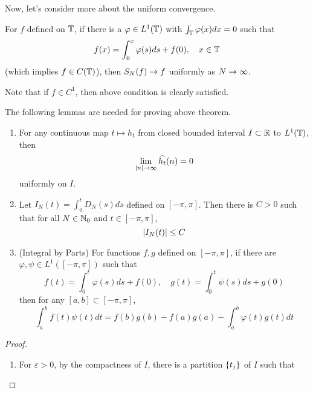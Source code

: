 \begin{enumerate}[label=\arabic*.]
	\noindent Now, let's consider more about the uniform convergence.
	\begin{thm}\label{thm:c1four}
		For $f$ defined on $\mathbb{T}$, if there is a $\varphi \in L^1(\mathbb{T})$ with $\int_{\mathbb{T}} \varphi(x)dx = 0$ such that
		\begin{equation*}
			f(x) = \int_0^x \varphi(s)ds + f(0),\quad x \in \mathbb{T}
		\end{equation*}
		(which implies $f \in C(\mathbb{T})$), then $S_N(f) \rightarrow f$ uniformly as $N \rightarrow \infty$.
	\end{thm}
	\begin{rmk}
		Note that if $f \in C^1$, then above condition is clearly satisfied.
	\end{rmk}
	\begin{lem}
		The following lemmas are needed for proving above theorem.
		\begin{enumerate}[label=\Roman{*}.]
			\item For any continuous map $t \mapsto h_t$ from closed bounded interval $I \subset \mathbb{R}$ to $L^1(\mathbb{T})$, then
			\begin{equation*}
				\lim_{\left\lvert n\right\lvert \rightarrow \infty}\widehat{h_t}(n) = 0
			\end{equation*}
			uniformly on $I$.
			\item Let $I_N(t) = \int_0^t D_N(s)ds$ defined on $[-\pi,\pi]$. Then there is $C > 0$ such that for all $N \in \mathbb{N}_0$ and $t \in [-\pi, \pi]$,
			\begin{equation*}
				\left\lvert I_N(t)\right\lvert \leq C
			\end{equation*}
			\item (Integral by Parts) For functions $f,g$ defined on $[-\pi,\pi]$, if there are $\varphi,\psi \in L^1([-\pi,\pi])$ such that
			\begin{equation*}
				f(t)=\int_0^t \varphi(s) d s+f(0), \quad g(t)=\int_0^t \psi(s) d s+g(0)
			\end{equation*}
			then for any $[a, b] \subset[-\pi, \pi]$,
			\begin{equation*}
				\int_a^b f(t) \psi(t) d t=f(b) g(b)-f(a) g(a)-\int_a^b \varphi(t) g(t) d t
			\end{equation*}
		\end{enumerate}
	\end{lem}
	\begin{proof}
		\begin{enumerate}[label=\Roman{*}.]
			\item For $\varepsilon > 0$, by the compactness of $I$, there is a partition $\left\{t_j\right\}$ of $I$ such that
			\begin{equation*}

\end{equation*}
\end{enumerate}
\end{proof}
\end{enumerate}
